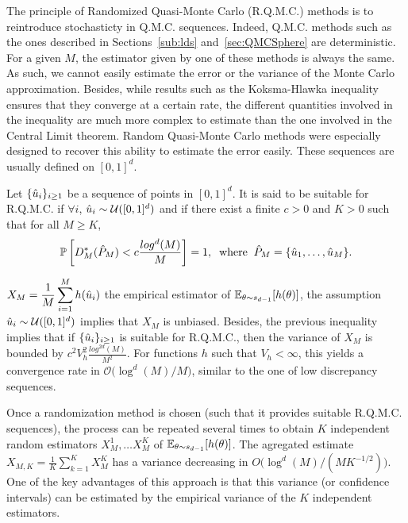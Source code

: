 The principle of Randomized Quasi-Monte Carlo (R.Q.M.C.) methods is to reintroduce stochasticty in Q.M.C. sequences.  Indeed, Q.M.C. methods such as the ones described in Sections~\autoref{sub:lds} and~\autoref{sec:QMCSphere} are deterministic. For a given $M$, the estimator given by one of these methods is always the same. As such, we cannot easily estimate the error or the variance of the Monte Carlo approximation. Besides, while results such as the Koksma-Hlawka inequality ensures that they converge at a certain rate, the different quantities involved in the inequality are much more complex to estimate than the one involved in the Central Limit theorem.  Random Quasi-Monte Carlo methods were especially designed to recover this ability to estimate the error easily.
These sequences are usually defined on $[0,1]^d$.
\begin{D}
Let $\{\hat{u}_i\}_{i \geq 1}$ be a sequence of points in $[0,1]^d$. It is said to be suitable for R.Q.M.C. if $\forall i$, $\hat{u}_i \sim \mathcal{U}([0,1]^d)$ and if there exist a finite $ c > 0 $ and $K > 0$ such that for all $M\geq K$, 
\begin{equation*}
\mathbb{P}\left[D_M^*(\hat{P}_M) < c\frac{log^d(M)}{M}\right] = 1, \;\;\text{where}\;\; \hat{P}_M = \{\hat{u}_1, \hdots, \hat{u}_M\}.
\end{equation*}
\end{D}

  $X_M = \displaystyle\frac{1}{M}\sum\limits_{i = 1}^{M} h(\hat{u}_i)$ the  {empirical} estimator of $\mathbb{E}_{\theta\sim s_{d-1}}[h(\theta)]$, the assumption $\hat{u}_i \sim \mathcal{U}([0,1]^d)$ implies that  $X_M$ is unbiased. Besides, the previous inequality implies that if  $\{\hat{u}_i\}_{i \geq 1}$ is suitable for R.Q.M.C., then the variance of $X_M$ is bounded by $c^2 V_h^2 \frac{log^{2d}(M)}{M^2}$. For functions $h$ such that $V_h <\infty$, this yields a convergence rate in $\mathcal{O}\big(\log^{d}(M)/M\big)$, similar to the one of low discrepancy sequences. 

Once a randomization method is chosen (such that it provides suitable R.Q.M.C. sequences), the process can be repeated several times to obtain $K$ independent random estimators $X_M^1,\dots X_M^K$ of $\mathbb{E}_{\theta\sim s_{d-1}}[h(\theta)]$. The agregated estimate $ X_{M,K} = \displaystyle\frac{1}{K}\sum\limits_{k = 1}^{K} X_M^K$ has a variance decreasing in $O\big(\log^{d}(M)/(MK^{-1/2}) \big)$. One of the key advantages of this approach is that this variance (or confidence intervals) can be estimated by the empirical variance of the $K$ independent estimators.

